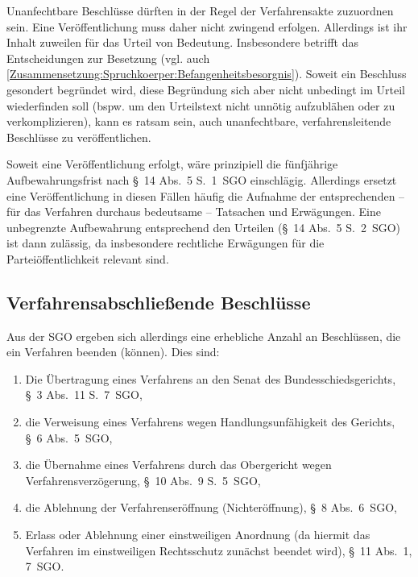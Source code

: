 Unanfechtbare Beschlüsse dürften in der Regel der Verfahrensakte zuzuordnen sein.
Eine Veröffentlichung muss daher nicht zwingend erfolgen.
Allerdings ist ihr Inhalt zuweilen für das Urteil von Bedeutung.
Insbesondere betrifft das Entscheidungen zur Besetzung (vgl. auch \ref{Zusammensetzung:Spruchkoerper:Befangenheitsbesorgnis}).
Soweit ein Beschluss gesondert begründet wird, diese Begründung sich aber nicht unbedingt im Urteil wiederfinden soll (bspw. um den Urteilstext nicht unnötig aufzublähen oder zu verkomplizieren), kann es ratsam sein, auch unanfechtbare, verfahrensleitende Beschlüsse zu veröffentlichen.

Soweit eine Veröffentlichung erfolgt, wäre prinzipiell die fünfjährige Aufbewahrungsfrist nach \S~14 Abs.~5 S.~1~SGO einschlägig.
Allerdings ersetzt eine Veröffentlichung in diesen Fällen häufig die Aufnahme der entsprechenden -- für das Verfahren durchaus bedeutsame -- Tatsachen und Erwägungen.
Eine unbegrenzte Aufbewahrung entsprechend den Urteilen (\S~14 Abs.~5 S.~2~SGO) ist dann zulässig, da insbesondere rechtliche Erwägungen für die Parteiöffentlichkeit relevant sind.


\subsection{Verfahrensabschließende Beschlüsse}
\label{Dokumentation:Beschlüsse:Verfahrensabschließend}
Aus der SGO ergeben sich allerdings eine erhebliche Anzahl an Beschlüssen, die ein Verfahren beenden (können).
Dies sind:
\begin{enumerate}
\item Die Übertragung eines Verfahrens an den Senat des Bundesschiedsgerichts, \S~3 Abs.~11 S.~7~SGO,
\item die Verweisung eines Verfahrens wegen Handlungsunfähigkeit des Gerichts, \S~6 Abs.~5~SGO,
\item die Übernahme eines Verfahrens durch das Obergericht wegen Verfahrensverzögerung, \S~10 Abs.~9 S.~5~SGO,
\item die Ablehnung der Verfahrenseröffnung (Nichteröffnung), \S~8 Abs.~6~SGO,
\item Erlass oder Ablehnung einer einstweiligen Anordnung (da hiermit das Verfahren im einstweiligen Rechtsschutz zunächst beendet wird), \S~11 Abs.~1, 7~SGO.
\end{enumerate}

